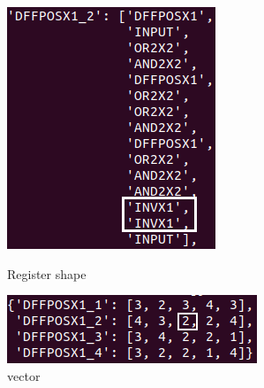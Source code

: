 \documentclass{tum-book}
\begin{document}
            \begin{figure}[h]
                \centering
                \begin{minipage}[b]{0.35\textwidth}
                    \includegraphics[width=\textwidth]{myFiles/myImages/shape_vector_1.png}
                    \caption{Register shape}
                    \label{fig:Register Shape}
                \end{minipage}
                \hfill
                \begin{minipage}[b]{0.35\textwidth}
                    \includegraphics[width=\textwidth]{myFiles/myImages/vector.png}
                    \caption{vector}
                    \label{fig:vector}
                \end{minipage}
            \end{figure}
\end{document}
